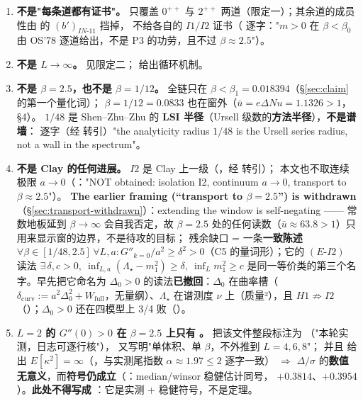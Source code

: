 \begin{notbox}
\begin{enumerate}[label=(\roman*)]
\item \textbf{不是"每条道都有证书"。} 只覆盖 $0^{++}$ 与 $2^{++}$ 两道（限定一）；其余道的成员性由 \LT{} 的 $(b')_{IN\text{-}11}$ 挡掉，
不给各自的 $I1/I2$ 证书（ 逐字："$m>0$ 在 $\beta<\beta_0$ 由 OS'78 逐道给出，不是 P3 的功劳，且不过 $\beta\approx2.5$"）。
\item \textbf{不是 $L\to\infty$。} 见限定二； 给出循环机制。
\item \textbf{不是 $\beta=2.5$，也不是 $\beta=1/12$。} 全链只在 $\beta<\beta_1=0.018394$（\S\ref{sec:claim} 的第一个量化词）；
$\beta=1/12=0.0833$ 也在窗外（$\bar u=e\Delta Nu=1.1326>1$， \S4）。
$1/48$ 是 Shen--Zhu--Zhu 的 \textbf{LSI 半径}（Ursell 级数的\textbf{方法半径}），\textbf{不是谱墙}：
 逐字（经  转引）"the analyticity radius $1/48$ is the Ursell series radius, not a wall in the spectrum"。\LT
\item \textbf{不是 Clay 的任何进展。} $I2$ 是 Clay 上一级（，经  转引）；
本文也不取连续极限 $a\to0$（："NOT obtained: isolation I2, continuum $a\to0$, transport to $\beta\approx2.5$"）。
\textbf{The earlier framing (``transport to $\beta=2.5$'') is withdrawn}（\S\ref{sec:transport-withdrawn}）：extending the window is self-negating —— 常数地板延到 $\beta\to\infty$ 会自我否定，故 $\beta=2.5$ 处的任何读数（$\bar u\approx63.8>1$）只用来显示窗的边界，不是待攻的目标；
残余缺口 = 一条\textbf{一致陈述} $\forall\beta\in[1/48,2.5]\,\forall L,a:G''_{k=0}/a^2\ge\delta^2>0$（C5 的量词形）；它的 $(E\text{-}I2)$ 读法 $\exists\,\delta,c>0,\ \inf_{L,a}(\Lambda_\star-m_1^2)\ge\delta,\ \inf_L m_1^2\ge c$ 是同一等价类的第三个名字。早先把它命名为 $\Delta_0>0$ 的读法\textbf{已撤回}：$\Delta_0$ 在曲率槽（$\delta_{\mathrm{curv}}:=a^2\Delta_0^2+W_{\mathrm{full}}$，无量纲）、$\Lambda_\star$ 在谱测度 $\nu$ 上（质量²），且 $H1\not\Rightarrow I2$（）；$\Delta_0>0$ 还在四模型上 3/4 败（）。\LM
\item \textbf{$L=2$ 的 $G''(0)>0$ 在 $\beta=2.5$ 上只有 \LE。}  把该文件整段标注为
\LE{}（"本轮实测，日志可逐行核"）， 又写明"单体积、单 $\beta$，不外推到 $L=4,6,8$"；
并且  给出 $E[\kappa^2]=\infty$（\LT，与实测尾指数 $\alpha\approx1.97\le2$ 逐字一致）
$\Rightarrow$ $\Delta/\sigma$ 的\textbf{数值无意义}，而\textbf{符号仍成立}（：median/winsor 稳健估计同号，
$+0.3814$、$+0.3954$）。\textbf{此处不得写成 \LT}：它是实测 + 稳健符号，不是定理。
\end{enumerate}
\end{notbox}

